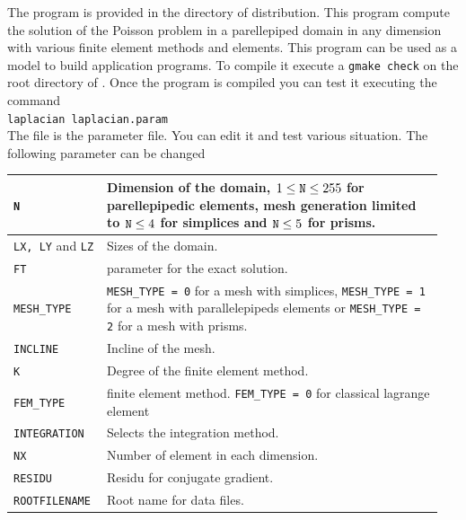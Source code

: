 \documentclass[11pt,a4paper]{article}
\begin{document}
The program  is provided in the directory  of \gf  distribution. This program compute the solution of the Poisson problem in a parellepiped domain in any dimension with various finite element methods and elements. This program can be used as a model to build application programs. To compile it execute a {\tt gmake check} on the root directory of \gf . Once the program is compiled you can test it executing the command\\[0.5cm]
{\tt laplacian laplacian.param}\\[0.5cm]
The file  is the parameter file. You can edit it and test various situation. The following parameter can be changed\\[0.5cm]
\begin{center} \begin{tabular}{|m{0.2\linewidth}|m{0.75\linewidth}|} \hline

  {\tt N} & Dimension of the domain, $1 \leq {\tt N} \leq 255$ for parellepipedic elements, mesh generation limited to ${\tt N} \leq 4$ for simplices and ${\tt N} \leq 5$ for prisms.  \\ \hline

  {\tt LX, LY} and {\tt LZ} &  Sizes of the domain. \\ \hline

  {\tt FT} &  parameter for the exact solution. \\ \hline

  {\tt MESH\_TYPE} &  {\tt MESH\_TYPE = 0} for a mesh with simplices,   {\tt MESH\_TYPE = 1} for a mesh with parallelepipeds elements or {\tt MESH\_TYPE = 2} for a mesh with prisms. \\ \hline

  {\tt INCLINE} &  Incline of the mesh.\\ \hline

  {\tt K} &  Degree of the finite element method. \\ \hline

  {\tt FEM\_TYPE} &  finite element method.  {\tt FEM\_TYPE = 0} for classical lagrange element\\ \hline

  {\tt INTEGRATION} & Selects the integration method.  \\ \hline

  {\tt NX} &  Number of element in each dimension. \\ \hline

  {\tt RESIDU} & Residu for conjugate gradient. \\ \hline

  {\tt ROOTFILENAME} & Root name for data files. \\ \hline

\end{tabular} \end{center}
\end{document}
